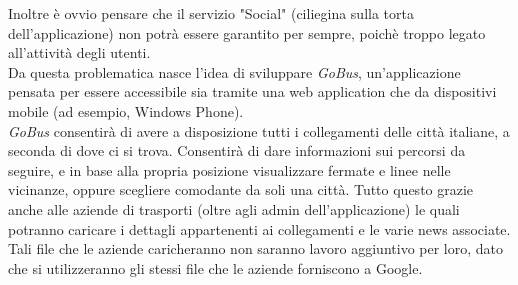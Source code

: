 Inoltre è ovvio pensare che il servizio "Social" (ciliegina sulla torta  dell'applicazione) non potrà essere garantito per sempre, poichè troppo legato all'attività degli utenti.\\
Da questa problematica nasce l’idea di sviluppare \emph{GoBus}, un’applicazione pensata per essere accessibile sia tramite una web application che da dispositivi mobile (ad esempio, Windows Phone).\\
\emph{GoBus} consentirà di avere a disposizione tutti i collegamenti delle citt\`{a} italiane, a seconda di dove ci si trova. Consentirà di dare informazioni sui percorsi da seguire, e in base alla propria posizione visualizzare fermate e linee nelle vicinanze, oppure scegliere comodante da soli una citt\`{a}.
Tutto questo grazie anche alle aziende di trasporti (oltre agli admin dell’applicazione) le quali potranno caricare i dettagli appartenenti ai collegamenti e le varie news associate. Tali file che le aziende caricheranno non saranno lavoro aggiuntivo per loro, dato che si utilizzeranno gli stessi file che le aziende forniscono a Google.